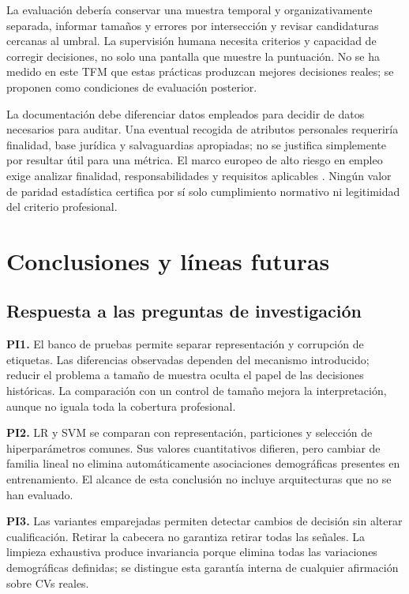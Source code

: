 \documentclass[11pt,a4paper,oneside]{report}
\begin{document}
La evaluación debería conservar una muestra temporal y organizativamente separada, informar tamaños y errores por intersección y revisar candidaturas cercanas al umbral. La supervisión humana necesita criterios y capacidad de corregir decisiones, no solo una pantalla que muestre la puntuación. No se ha medido en este TFM que estas prácticas produzcan mejores decisiones reales; se proponen como condiciones de evaluación posterior.

La documentación debe diferenciar datos empleados para decidir de datos necesarios para auditar. Una eventual recogida de atributos personales requeriría finalidad, base jurídica y salvaguardias apropiadas; no se justifica simplemente por resultar útil para una métrica. El marco europeo de alto riesgo en empleo exige analizar finalidad, responsabilidades y requisitos aplicables \cite{aiact2024,omnibus2026}. Ningún valor de paridad estadística certifica por sí solo cumplimiento normativo ni legitimidad del criterio profesional.

\chapter{Conclusiones y líneas futuras}
\section{Respuesta a las preguntas de investigación}
\textbf{PI1.} El banco de pruebas permite separar representación y corrupción de etiquetas. Las diferencias observadas dependen del mecanismo introducido; reducir el problema a tamaño de muestra oculta el papel de las decisiones históricas. La comparación con un control de tamaño mejora la interpretación, aunque no iguala toda la cobertura profesional.

\textbf{PI2.} LR y SVM se comparan con representación, particiones y selección de hiperparámetros comunes. Sus valores cuantitativos difieren, pero cambiar de familia lineal no elimina automáticamente asociaciones demográficas presentes en entrenamiento. El alcance de esta conclusión no incluye arquitecturas que no se han evaluado.

\textbf{PI3.} Las variantes emparejadas permiten detectar cambios de decisión sin alterar cualificación. Retirar la cabecera no garantiza retirar todas las señales. La limpieza exhaustiva produce invariancia porque elimina todas las variaciones demográficas definidas; se distingue esta garantía interna de cualquier afirmación sobre CVs reales.
\end{document}
